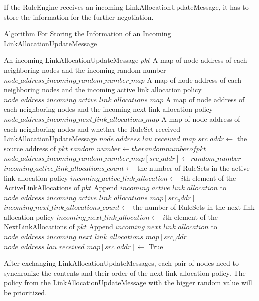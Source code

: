 If the RuleEngine receives an incoming LinkAllocationUpdateMessage, it has to store the information for the further negotiation.
\begin{algorithm}[H]  
  \caption{Algorithm For Storing the Information of an Incoming LinkAllocationUpdateMessage}                 
  \begin{algorithmic}[1]
    \Require An incoming LinkAllocationUpdateMessage $pkt$
    \Require  A map of node address of each neighboring nodes and the incoming random number $node\_address\_incoming\_random\_number\_map$
    \Require  A map of node address of each neighboring nodes and the incoming active link allocation policy $node\_address\_incoming\_active\_link\_allocations\_map$
    \Require  A map of node address of each neighboring nodes and the incoming next link allocation policy $node\_address\_incoming\_next\_link\_allocations\_map$
    \Require  A map of node address of each neighboring nodes and whether the RuleSet received LinkAllocationUpdateMessage $node\_address\_lau\_received\_map$
    \State $src\_addr \gets$ the source address of $pkt$
    \State $random\_number \gets the random number of pkt$
    \State $node\_address\_incoming\_random\_number\_map[src\_addr] \gets random\_number$
    \State $incoming\_active\_link\_allocations\_count \gets$ the number of RuleSets in the active link allocation policy
      \State $incoming\_active\_link\_allocation \gets$ $i$th element of the ActiveLinkAllocations of $pkt$
      \State Append $incoming\_active\_link\_allocation$ to $node\_address\_incoming\_active\_link\_allocations\_map[src_addr]$
    \EndFor
    \State $incoming\_next\_link\_allocations\_count \gets$ the number of RuleSets in the next link allocation policy
      \State $incoming\_next\_link\_allocation \gets$ $i$th element of the NextLinkAllocations of $pkt$
      \State Append $incoming\_next\_link\_allocation$ to $node\_address\_incoming\_next\_link\_allocations\_map[src_addr]$
    \EndFor
    \State $node\_address\_lau\_received\_map[src\_addr] \gets$ True
  \end{algorithmic}
\end{algorithm}

After exchanging LinkAllocationUpdateMessages, each pair of nodes need to synchronize the contents and their order of the next link allocation policy.
The policy from the LinkAllocationUpdateMessage with the bigger random value will be prioritized.

